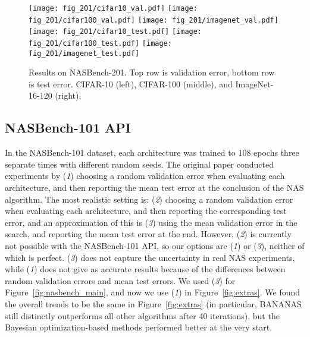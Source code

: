 \documentclass[11pt]{article}
\numberwithin{equation}{section}
\numberwithin{figure}{section}
\theoremstyle{plain}
\theoremstyle{definition}
\begin{document}
\begin{figure*}
\centering \texttt{[image: fig\_201/cifar10\_val.pdf]}
\hspace{-3pt}
\texttt{[image: fig\_201/cifar100\_val.pdf]}
\hspace{-3pt}
\texttt{[image: fig\_201/imagenet\_val.pdf]}
\texttt{[image: fig\_201/cifar10\_test.pdf]}
\hspace{-3pt}
\texttt{[image: fig\_201/cifar100\_test.pdf]}
\hspace{-3pt}
\texttt{[image: fig\_201/imagenet\_test.pdf]}
\caption{
Results on NASBench-201. Top row is validation error, bottom row is test error.
CIFAR-10 (left), CIFAR-100 (middle), and ImageNet-16-120 (right).
}
\label{fig:201_baselines}
\end{figure*}






\subsection{NASBench-101 API}
\label{app:experiments:rand_val_error}
In the NASBench-101 dataset, each architecture was trained to 108 epochs three separate times with different random seeds.
The original paper conducted experiments by 
(\emph{1}) choosing a random validation error when evaluating each architecture, and then reporting the mean test error at the conclusion of the NAS algorithm. 
The most realistic setting is:
(\emph{2}) choosing a random validation error when evaluating each architecture, 
and then reporting the corresponding test error, and an approximation of this is
(\emph{3}) using the mean validation error in the search, and reporting the mean test error at the end.
However, (\emph{2}) is currently not possible with the NASBench-101 API, so our options are
(\emph{1}) or (\emph{3}), neither of which is perfect.
(\emph{3}) does not capture the uncertainty in real NAS experiments, while (\emph{1}) does not give as
accurate results because of the differences between random validation errors and mean test errors.
We used (\emph{3}) for Figure~\ref{fig:nasbench_main}, and now we use
(\emph{1}) in Figure~\ref{fig:extras}.
We found the overall trends to be the same in Figure~\ref{fig:extras} 
(in particular, BANANAS still distinctly outperforms all other algorithms after 40 iterations),
but the Bayesian optimization-based methods performed better at the very start.
\end{document}
